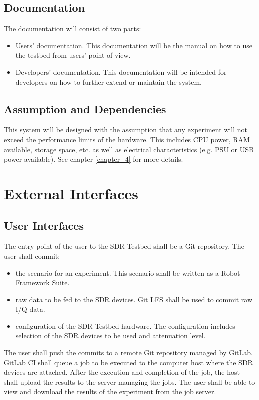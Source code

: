 \documentclass[english,titlepage,a4paper]{report}
\begin{document}
\section{Documentation}

The documentation will consist of two parts:
\begin{itemize}
\item Users' documentation. This documentation will be the manual on how to use the testbed from users' point of view.
\item Developers' documentation. This documentation will be intended for developers on how to further extend or maintain the system.
\end{itemize}

\section{Assumption and Dependencies}

This system will be designed with the assumption that any experiment will not exceed the performance limits of the hardware.
This includes CPU power, RAM available, storage space, etc. as well as electrical characteristics (e.g. PSU or USB power available).
See chapter \ref{chapter_4} for more details.


\chapter{External Interfaces}
\section{User Interfaces}

The entry point of the user to the SDR Testbed shall be a Git repository.
The user shall commit:
\begin{itemize}
\item the scenario for an experiment.
  This scenario shall be written as a Robot Framework Suite.
\item raw data to be fed to the SDR devices.
  Git LFS shall be used to commit raw I/Q data.
\item configuration of the SDR Testbed hardware.
  The configuration includes selection of the SDR devices to be used and attenuation level.
\end{itemize}
The user shall push the commits to a remote Git repository managed by GitLab.
GitLab CI shall queue a job to be executed to the computer host where the SDR devices are attached.
After the execution and completion of the job, the host shall upload the results to the server managing the jobs.
The user shall be able to view and download the results of the experiment from the job server.
\end{document}
